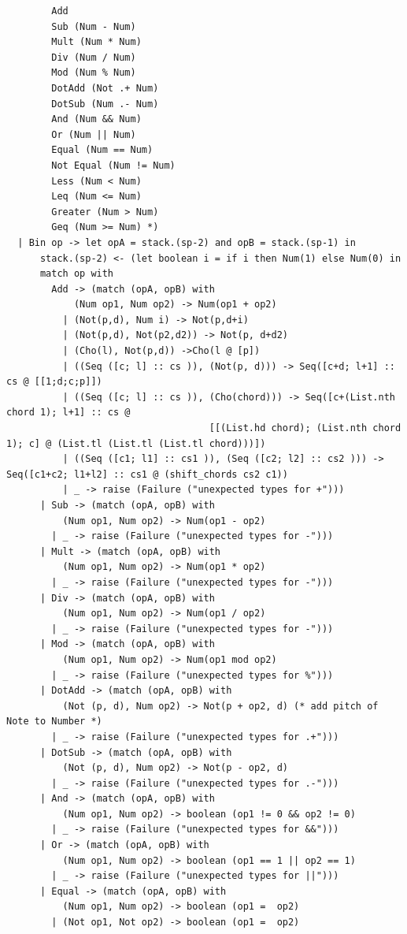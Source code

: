\documentclass[12pt,A4]{book}
\begin{document}
\begin{verbatim}
        Add
        Sub (Num - Num)
        Mult (Num * Num)
        Div (Num / Num)
        Mod (Num % Num)
        DotAdd (Not .+ Num)
        DotSub (Num .- Num)
        And (Num && Num)
        Or (Num || Num)
        Equal (Num == Num)
        Not Equal (Num != Num)
        Less (Num < Num)
        Leq (Num <= Num)
        Greater (Num > Num)
        Geq (Num >= Num) *)
  | Bin op -> let opA = stack.(sp-2) and opB = stack.(sp-1) in     
      stack.(sp-2) <- (let boolean i = if i then Num(1) else Num(0) in
      match op with
        Add -> (match (opA, opB) with 
            (Num op1, Num op2) -> Num(op1 + op2)
          | (Not(p,d), Num i) -> Not(p,d+i)
          | (Not(p,d), Not(p2,d2)) -> Not(p, d+d2)
          | (Cho(l), Not(p,d)) ->Cho(l @ [p])
          | ((Seq ([c; l] :: cs )), (Not(p, d))) -> Seq([c+d; l+1] :: cs @ [[1;d;c;p]])
          | ((Seq ([c; l] :: cs )), (Cho(chord))) -> Seq([c+(List.nth chord 1); l+1] :: cs @  
                                    [[(List.hd chord); (List.nth chord 1); c] @ (List.tl (List.tl (List.tl chord)))])
          | ((Seq ([c1; l1] :: cs1 )), (Seq ([c2; l2] :: cs2 ))) -> Seq([c1+c2; l1+l2] :: cs1 @ (shift_chords cs2 c1))
          | _ -> raise (Failure ("unexpected types for +")))
      | Sub -> (match (opA, opB) with 
          (Num op1, Num op2) -> Num(op1 - op2)
        | _ -> raise (Failure ("unexpected types for -")))
      | Mult -> (match (opA, opB) with 
          (Num op1, Num op2) -> Num(op1 * op2)
        | _ -> raise (Failure ("unexpected types for -")))
      | Div -> (match (opA, opB) with 
          (Num op1, Num op2) -> Num(op1 / op2)
        | _ -> raise (Failure ("unexpected types for -")))
      | Mod -> (match (opA, opB) with 
          (Num op1, Num op2) -> Num(op1 mod op2)
        | _ -> raise (Failure ("unexpected types for %")))
      | DotAdd -> (match (opA, opB) with 
          (Not (p, d), Num op2) -> Not(p + op2, d) (* add pitch of Note to Number *)
        | _ -> raise (Failure ("unexpected types for .+")))
      | DotSub -> (match (opA, opB) with 
          (Not (p, d), Num op2) -> Not(p - op2, d) 
        | _ -> raise (Failure ("unexpected types for .-")))
      | And -> (match (opA, opB) with 
          (Num op1, Num op2) -> boolean (op1 != 0 && op2 != 0)
        | _ -> raise (Failure ("unexpected types for &&")))
      | Or -> (match (opA, opB) with 
          (Num op1, Num op2) -> boolean (op1 == 1 || op2 == 1)
        | _ -> raise (Failure ("unexpected types for ||")))
      | Equal -> (match (opA, opB) with 
          (Num op1, Num op2) -> boolean (op1 =  op2)
		| (Not op1, Not op2) -> boolean (op1 =  op2)

\end{verbatim}
\end{document}
